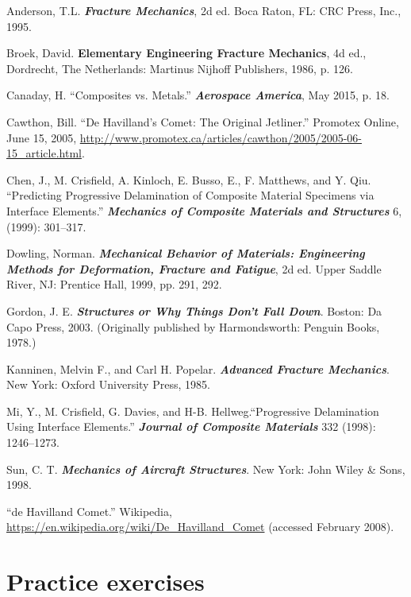 \documentclass{AeroStructure-ERJohnson}
\begin{document}
\begin{thebibliography}{}\label{sec13.8}
\bibitem{} Anderson, T.L. \textit{\textbf{Fracture Mechanics}}, 2d ed. Boca Raton, FL: CRC Press, Inc., 1995.

\bibitem{} Broek, David. \textbf{Elementary Engineering Fracture Mechanics}, 4d ed., Dordrecht, The Netherlands: Martinus Nijhoff Publishers, 1986, p. 126.

\bibitem{} Canaday, H. ``Composites vs. Metals.'' \textit{\textbf{Aerospace America}}, May 2015, p. 18.

\bibitem{} Cawthon, Bill. ``De Havilland's Comet: The Original Jetliner.'' Promotex Online, June 15, 2005, \url{http://www.promotex.ca/articles/cawthon/2005/2005-06-15_article.html}.

\bibitem{} Chen, J., M. Crisfield, A. Kinloch, E. Busso, E., F. Matthews, and Y. Qiu. ``Predicting Progressive Delamination of Composite Material Specimens via Interface Elements.'' \textit{\textbf{Mechanics of Composite Materials and Structures}} 6, (1999): 301--317.

\bibitem{} Dowling, Norman. \textit{\textbf{Mechanical Behavior of Materials: Engineering Methods for Deformation, Fracture and Fatigue}}, 2d ed. Upper Saddle River, NJ: Prentice Hall, 1999, pp. 291, 292\vadjust{\vspace*{6pt}\pagebreak}.

\bibitem{} Gordon, J. E. \textit{\textbf{Structures} \textbf{or Why Things Don’t Fall Down}}. Boston: Da Capo Press, 2003. (Originally published by Harmondsworth: Penguin Books, 1978.)

\bibitem{} Kanninen, Melvin F., and Carl H. Popelar. \textit{\textbf{Advanced Fracture Mechanics}}. New York: Oxford University Press, 1985.

\bibitem{} Mi, Y., M. Crisfield, G. Davies, and H-B. Hellweg.``Progressive Delamination Using Interface Elements.'' \textit{\textbf{Journal of Composite Materials}} 332 (1998): 1246--1273.

\bibitem{} Sun, C. T. \textbf{\textit{Mechanics of Aircraft Structures}}. New York: John Wiley \& Sons, 1998.

\bibitem{} ``de Havilland Comet.'' Wikipedia, \url{https://en.wikipedia.org/wiki/De_Havilland_Comet} (accessed February 2008).
\end{thebibliography}

\section{Practice exercises}\label{sec13.9}
\end{document}

